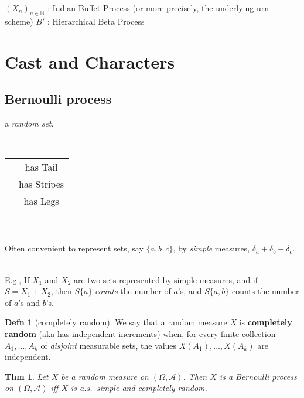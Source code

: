 \documentclass[reqno,oneside,twocolumn,10pt]{amsart}
\newtheorem*{thm}{{\color{BrickRed}Thm}}
\theoremstyle{definition}
\newtheorem*{definition}{{\color{OliveGreen}Defn}}
\theoremstyle{remark}
\newcommand{\defn}[1]{{\bf #1}}
\newcommand{\nprocess}[3]{(#1_{#3})_{#3 \in #2}}
\newcommand{\bspace}{\Omega}
\newcommand{\bsa}{\mathcal A}
\newcommand{\borelspace}{(\bspace,\bsa)}
\newcommand{\Nats}{\mathbb{N}}
\newcommand{\process}[2]{\nprocess #1 #2 n}
\begin{document}
\vspace{1em}

\noindent
$\process X \Nats$ : Indian Buffet Process \citep{GG05,GG06} 
(or more precisely, the underlying urn scheme)\newline
$B'$ : Hierarchical Beta Process \citep{Thibaux2007}\newline

\newpage

\section{Cast and Characters}

\subsection{Bernoulli process} 

a \emph{random set}.

\ \\
\begin{tabular}{cc}
&has Tail \\
&has Stripes \\
&has Legs
\end{tabular}

\ \\

\ \\
\noindent
Often convenient to represent sets, say $\{a,b,c\}$, by \emph{simple} measures, $\delta_a+\delta_b+\delta_c$.  

\ \\
\noindent 
E.g., If $X_1$ and $X_2$ are two sets represented by simple measures, and if $S = X_1+X_2$, then $S\{a\}$ \emph{counts} the number of $a$'s, and $S\{a,b\}$ counts the number of $a$'s and $b$'s.

\begin{definition}[completely random]
We say that a random measure $X$ is \defn{completely random} (aka has independent increments)
when, for every finite collection $A_1,\dotsc, A_k$ of \emph{disjoint} measurable sets, the values $X(A_1), \dotsc, X(A_k)$ are independent.
\end{definition}

\begin{thm}
Let $X$ be a random measure on $\borelspace$.
Then $X$ is a Bernoulli process on $\borelspace$ iff $X$ is a.s.\ simple and completely random.
\end{thm}
\end{document}
